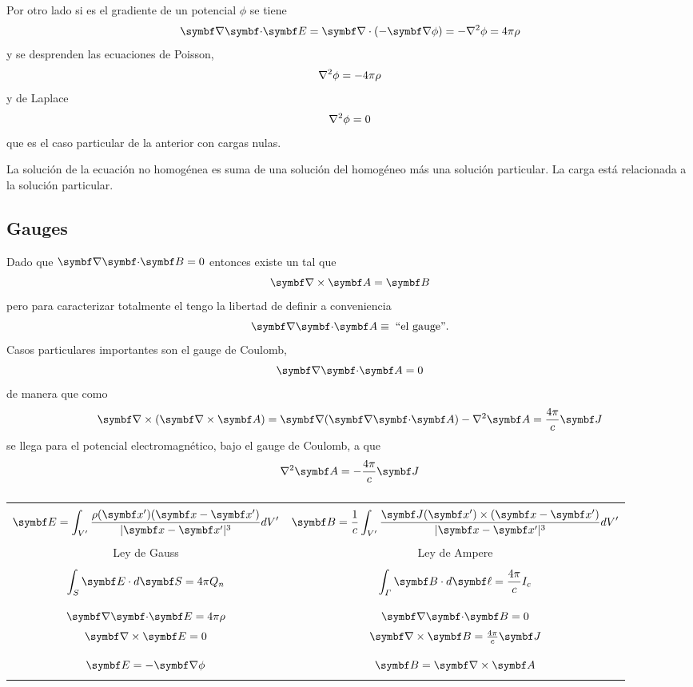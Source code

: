 \documentclass[10pt,oneside]{CBFT_book}
\begin{document}
Por otro lado si  es el gradiente de un potencial $\phi$ se tiene
\[
	\divem{E} = \Nabla\cdot{(-\Nabla\phi)} = - \lapm\phi = 4\pi \rho
\]
y se desprenden las ecuaciones de Poisson,
\[
	\nabla^2{\phi} = -4\pi \rho
\]
y de Laplace
\[
	\nabla^2{\phi} = 0
\]
que es el caso particular de la anterior con cargas nulas.

La solución de la ecuación no homogénea es suma de una solución del homogéneo más una solución
particular. La carga está relacionada a la solución particular.

\subsection{Gauges}

Dado que $\divem{B}=0$ entonces existe un  tal que 
\[
	\rotorm{A} = \vb{B}
\]
pero para caracterizar totalmente el  tengo la libertad de definir a conveniencia
\[
	\divem{A} \equiv \; \textrm{``el gauge''}.
\]
Casos particulares importantes son el gauge de Coulomb,
\[
	\divem{A} = 0
\]
de manera que como 
\[
	\Nabla \times (\rotorm{A}) = \Nabla(\divem{A}) - \lapm{\vb{A}} = \frac{4\pi}{c}\vb{J}
\]
se llega para el potencial electromagnético, bajo el gauge de Coulomb, a que 
\[
	\lapm{\vb{A}} = - \frac{4\pi}{c}\vb{J} 
\]

	\begin{table}[hbt]
	\centering
        \begin{tabular}{|c|c|}
		\hline
		& \\
		$\displaystyle{\vb{E} = \int_{V'} \frac{\rho(\vb{x}')(\vb{x}-\vb{x}')}{|\vb{x}-\vb{x}'|^3} dV' 
		}$ & $\displaystyle{\vb{B} = \frac{1}{c} \int_{V'} \frac{\vb{J}(\vb{x}') \times 
		(\vb{x}-\vb{x}')}{|\vb{x}-\vb{x}'|^3} dV'}$ \\
		& \\
		\hline
		Ley de Gauss & Ley de Ampere \\
		& \\
		$\displaystyle{\int_S \vb{E}\cdot d\vb{S} = 4\pi Q_n}$ &
		$\displaystyle{\int_\Gamma \vb{B}\cdot d\vb{\ell} = \frac{4\pi}{c} I_c}$ \\
		& \\
		\hline
		&\\
		$\divem{E} = 4\pi\rho$ & $\divem{B} = 0$ \\
		$\rotorm{E} = 0$ & $\rotorm{B} = \frac{4\pi}{c}\vb{J}$ \\
		& \\
		\hline
		& \\
		$\vb{E} = - \Nabla\phi$ & $\vb{B} = \rotorm{A}$ \\
		& \\
		\hline
        \end{tabular} 
	\caption{}
	\end{table} 
\end{document}

